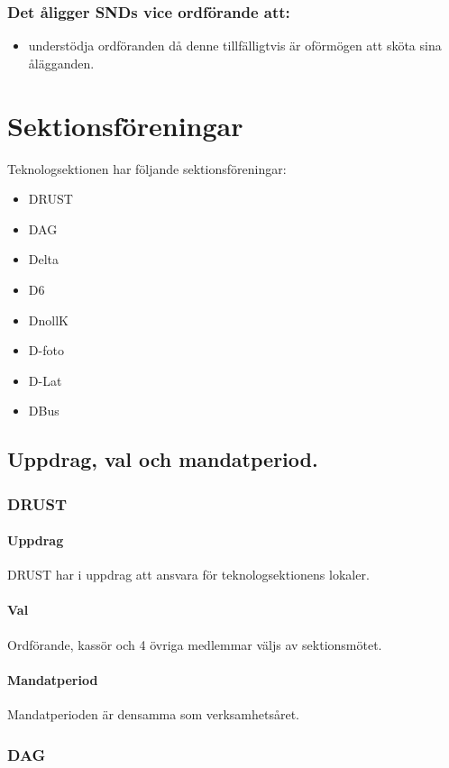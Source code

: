 \documentclass[a4paper, 10pt]{article}
\begin{document}
\subsubsection{Det åligger SNDs vice ordförande att:}
\begin{itemize}
  \item understödja ordföranden då denne tillfälligtvis är oförmögen att sköta sina ålägganden.
\end{itemize}
\newpage
\section{Sektionsföreningar}
Teknologsektionen har följande sektionsföreningar: 
\begin{itemize}
  \item DRUST 
  \item DAG 
  \item Delta 
  \item D6 
  \item DnollK
  \item D-foto
  \item D-Lat
  \item DBus
\end{itemize}
\subsection{Uppdrag, val och mandatperiod.}
\subsubsection{DRUST} 
\paragraph{Uppdrag\\}
DRUST har i uppdrag att ansvara för teknologsektionens lokaler.
\paragraph{Val\\}
Ordförande, kassör och 4 övriga medlemmar väljs av sektionsmötet. 
\paragraph{Mandatperiod\\}
Mandatperioden är densamma som verksamhetsåret. 
\subsubsection{DAG}
\end{document}
